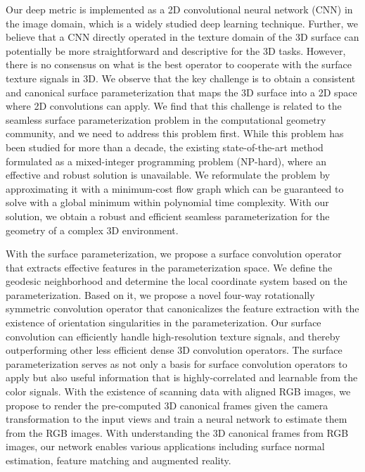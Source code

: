 Our deep metric is implemented as a 2D convolutional neural network (CNN) in the image domain, which is a widely studied deep learning technique. Further, we believe that a CNN directly operated in the texture domain of the 3D surface can potentially be more straightforward and descriptive for the 3D tasks.
%
However, there is no consensus on what is the best operator to cooperate with the surface texture signals in 3D.
%
We observe that the key challenge is to obtain a consistent and canonical surface parameterization that maps the 3D surface into a 2D space where 2D convolutions can apply.
%
We find that this challenge is related to the seamless surface parameterization problem in the computational geometry community, and we need to address this problem first. While this problem has been studied for more than a decade, the existing state-of-the-art method formulated as a mixed-integer programming problem (NP-hard), where an effective and robust solution is unavailable.
%
We reformulate the problem by approximating it with a minimum-cost flow graph which can be guaranteed to solve with a global minimum within polynomial time complexity. With our solution, we obtain a robust and efficient seamless parameterization for the geometry of a complex 3D environment.


With the surface parameterization, we propose a surface convolution operator that extracts effective features in the parameterization space.
%
We define the geodesic neighborhood and determine the local coordinate system based on the parameterization.
Based on it, we propose a novel four-way rotationally symmetric convolution operator that canonicalizes the feature extraction with the existence of orientation singularities in the parameterization.
%
Our surface convolution can efficiently handle high-resolution texture signals, and thereby outperforming other less efficient dense 3D convolution operators.
%
The surface parameterization serves as not only a basis for surface convolution operators to apply but also useful information that is highly-correlated and learnable from the color signals. With the existence of scanning data with aligned RGB images, we propose to render the pre-computed 3D canonical frames given the camera transformation to the input views and train a neural network to estimate them from the RGB images. With understanding the 3D canonical frames from RGB images, our network enables various applications including surface normal estimation, feature matching and augmented reality. 
